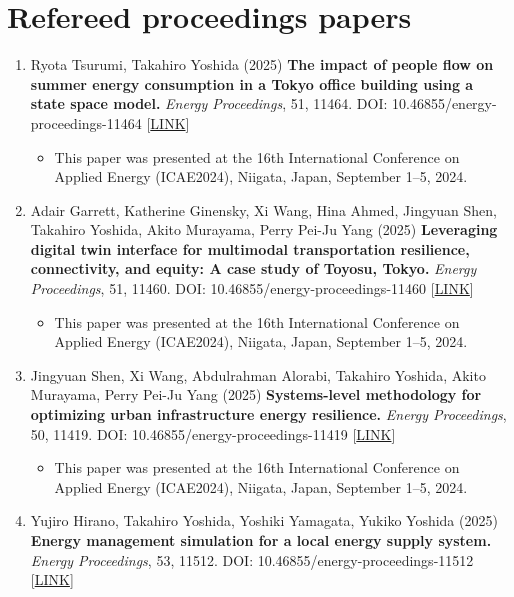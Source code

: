 \documentclass[
]{book}
\providecommand{\tightlist}{%
  \setlength{\itemsep}{0pt}\setlength{\parskip}{0pt}}
\begin{document}
\section*{Refereed proceedings papers}\label{refereed-proceedings-papers}

\begin{enumerate}
\def\labelenumi{\arabic{enumi}.}
\tightlist
\item
  Ryota Tsurumi, Takahiro Yoshida (2025)
  \textbf{The impact of people flow on summer energy consumption in a Tokyo office building using a state space model.}
  \emph{Energy Proceedings}, 51, 11464.
  DOI: 10.46855/energy-proceedings-11464 {[}\href{https://doi.org/10.46855/energy-proceedings-11464}{LINK}{]}

  \begin{itemize}
  \tightlist
  \item
    This paper was presented at the 16th International Conference on Applied Energy (ICAE2024), Niigata, Japan, September 1--5, 2024.
  \end{itemize}
\item
  Adair Garrett, Katherine Ginensky, Xi Wang, Hina Ahmed, Jingyuan Shen, Takahiro Yoshida, Akito Murayama, Perry Pei-Ju Yang (2025)
  \textbf{Leveraging digital twin interface for multimodal transportation resilience, connectivity, and equity: A case study of Toyosu, Tokyo.}
  \emph{Energy Proceedings}, 51, 11460.
  DOI: 10.46855/energy-proceedings-11460 {[}\href{https://doi.org/10.46855/energy-proceedings-11460}{LINK}{]}

  \begin{itemize}
  \tightlist
  \item
    This paper was presented at the 16th International Conference on Applied Energy (ICAE2024), Niigata, Japan, September 1--5, 2024.
  \end{itemize}
\item
  Jingyuan Shen, Xi Wang, Abdulrahman Alorabi, Takahiro Yoshida, Akito Murayama, Perry Pei-Ju Yang (2025)
  \textbf{Systems-level methodology for optimizing urban infrastructure energy resilience.}
  \emph{Energy Proceedings}, 50, 11419.
  DOI: 10.46855/energy-proceedings-11419 {[}\href{https://doi.org/10.46855/energy-proceedings-11419}{LINK}{]}

  \begin{itemize}
  \tightlist
  \item
    This paper was presented at the 16th International Conference on Applied Energy (ICAE2024), Niigata, Japan, September 1--5, 2024.
  \end{itemize}
\item
  Yujiro Hirano, Takahiro Yoshida, Yoshiki Yamagata, Yukiko Yoshida (2025)
  \textbf{Energy management simulation for a local energy supply system.}
  \emph{Energy Proceedings}, 53, 11512.
  DOI: 10.46855/energy-proceedings-11512 {[}\href{https://doi.org/10.46855/energy-proceedings-11512}{LINK}{]}


\end{enumerate}
\end{document}
